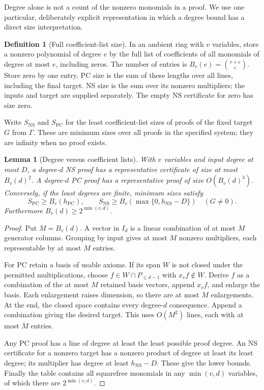 \documentclass[11pt,a4paper,oneside,openany]{book}
\newtheorem{lemma}[theorem]{Lemma}
\theoremstyle{definition}\newtheorem{definition}[theorem]{Definition}
\theoremstyle{remark}\newtheorem{remark}[theorem]{Remark}
\newcommand{\NS}{\mathrm{NS}}\newcommand{\PC}{\mathrm{PC}}
\numberwithin{equation}{chapter}
\begin{document}
Degree alone is not a count of the nonzero monomials in a proof. We use
one particular, deliberately explicit representation in which a degree
bound has a direct size interpretation.

\begin{definition}[Full coefficient-list size]\label{tx:def:dense-size}
In an ambient ring with $v$ variables, store a nonzero polynomial of
degree $e$ by the full list of coefficients of all monomials of degree
at most $e$, including zeros. The number of entries is
$B_v(e)=\binom{v+e}{e}$. Store zero by one entry. PC size is the sum of
these lengths over all lines, including the final target. NS size is
the sum over its nonzero multipliers; the inputs and target are supplied
separately. The empty NS certificate for zero has size zero.
\end{definition}

Write $S_{\NS}$ and $S_{\PC}$ for the least coefficient-list sizes of
proofs of the fixed target $G$ from $\Gamma$. These are minimum sizes
over all proofs in the specified system; they are infinity when no
proof exists.

\begin{lemma}[Degree versus coefficient lists]\label{tx:lem:dense-size}
With $v$ variables and input degree at most $D$, a degree-$d$ NS proof
has a representative certificate of size at most $B_v(d)^2$. A
 degree-$d$ PC proof has a representative proof of size $O(B_v(d)^3)$.
Conversely, if the least degrees are finite, minimum sizes satisfy
\[
 S_{\PC}\ge B_v(h_{\PC}),\qquad
 S_{\NS}\ge B_v(\max\{0,h_{\NS}-D\})\quad(G\ne0).
\]
Furthermore $B_v(d)\ge2^{\min(v,d)}$.
\end{lemma}
\begin{proof}
Put $M=B_v(d)$. A vector in $I_d$ is a linear combination of at most
$M$ generator columns. Grouping by input gives at most $M$ nonzero
multipliers, each representable by at most $M$ entries.

For PC retain a basis of usable axioms. If its span $W$ is not closed
under the permitted multiplications, choose
$f\in W\cap P_{\le d-1}$ with $x_vf\notin W$. Derive $f$ as a
combination of the at most $M$ retained basis vectors, append $x_vf$,
and enlarge the basis. Each enlargement raises dimension, so there are
at most $M$ enlargements. At the end, the closed space contains every
degree-$d$ consequence. Append a combination giving the desired target.
This uses $O(M^2)$ lines, each with at most $M$ entries.

Any PC proof has a line of degree at least the least possible proof
degree. An NS certificate for a nonzero target has a nonzero product
of degree at least its least degree; its multiplier has degree at least
$h_{\NS}-D$. These give the lower bounds. Finally the table contains
all squarefree monomials in any $\min(v,d)$ variables, of which there
are $2^{\min(v,d)}$.
\end{proof}
\end{document}
